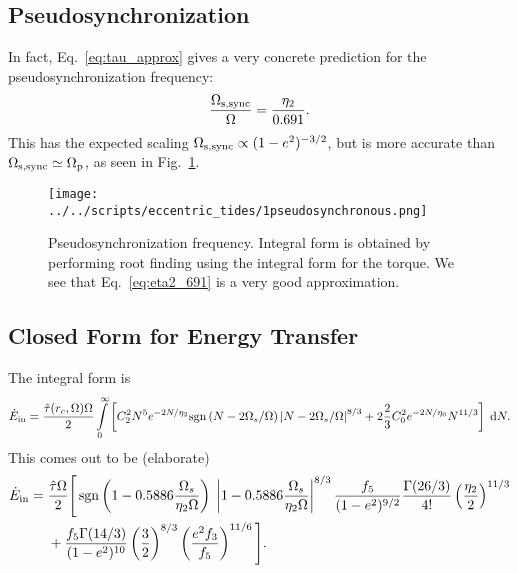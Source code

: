 \documentclass[
        fleqn,
        usenatbib,
        referee,
    ]{mnras}
\DeclareMathOperator*{\sgn}{sgn}
\begin{document}
\subsection{Pseudosynchronization}

In fact, Eq.~\eqref{eq:tau_approx} gives a very concrete prediction for the
pseudosynchronization frequency:
\begin{equation}
    \frac{\Omega_{\rm s, sync}}{\Omega} =
        \frac{\eta_2}{0.691}.\label{eq:eta2_691}
\end{equation}
This has the expected scaling $\Omega_{\rm s, sync} \propto (1 - e^2)^{-3/2}$,
but is more accurate than $\Omega_{\rm s, sync} \simeq \Omega_{\rm p}$, as seen
in Fig.~\ref{fig:pseudosync}.
\begin{figure}
    \centering
    \texttt{[image: ../../scripts/eccentric\_tides/1pseudosynchronous.png]}
    \caption{Pseudosynchronization frequency. Integral form is obtained by
    performing root finding using the integral form for the torque. We see that
    Eq.~\eqref{eq:eta2_691} is a very good approximation.}\label{fig:pseudosync}
\end{figure}

\subsection{Closed Form for Energy Transfer}

The integral form is
\begin{equation}
    \dot{E}_{\rm in} =
        \frac{\hat{\tau}(r_c, \Omega) \Omega}{2} \int\limits_0^\infty \left[
            C_2^2 N^5 e^{-2N/\eta_2} \mathrm{sgn}\left(N - 2\Omega_s /
                \Omega\right) \left|N - 2 \Omega_s / \Omega\right|^{8/3}
            + 2 \frac{2}{3} C_0^2 e^{-2N / \eta_0} N^{11/3}
        \right]\;\mathrm{d}N.\label{eq:heating_int}
\end{equation}
This comes out to be (elaborate)
\begin{align}
    \dot{E}_{\rm in} ={}& \frac{\hat{\tau}\Omega}{2}\Bigg[
    \sgn\left(1 - 0.5886\frac{\Omega_s}{\eta_2 \Omega}\right)\;\left|1 -
        0.5886\frac{\Omega_s}{\eta_2 \Omega}\right|^{8/3}
            \frac{f_5}{(1 - e^2)^{9/2}}
            \frac{\Gamma(26/3)}{4!} \left(\frac{\eta_2}{2}\right)^{11/3}
            \nonumber\\
        &+
    \frac{f_5 \Gamma(14 / 3)}{(1 - e^2)^{10}} \left(\frac{3}{2}\right)^{8/3}
            \left(\frac{e^2 f_3}{f_5}\right)^{11/6}\Bigg].
            \label{eq:total_heating}
\end{align}
\end{document}
